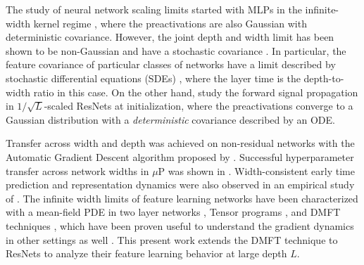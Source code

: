 \documentclass{article} %
\begin{document}
The study of neural network scaling limits started with MLPs in the infinite-width kernel regime \citep{jacot2018neural, neal2012bayesian, matthews2018gaussian, lee2017deep}, where the preactivations are also Gaussian with deterministic covariance. 
% 
However, the joint depth and width limit has been shown to be non-Gaussian \citep{hanin2020products, noci2021precise} and have a stochastic covariance \citep{li2021future}. 
% 
In particular, the feature covariance of particular classes of networks have a limit described by stochastic differential equations (SDEs) \citep{li2022neural,noci2023shaped}, where the layer time is the depth-to-width ratio in this case. 
% 
On the other hand, \cite{hayou2023width} study the forward signal propagation in ${1}/{\sqrt L}$-scaled ResNets at initialization, where the preactivations converge to a Gaussian distribution with a \emph{deterministic} covariance described by an ODE. 
% 
% 
% 


Transfer across width and depth was achieved on non-residual networks with the Automatic Gradient Descent algorithm proposed by \cite{bernstein2020distance, bernstein2023automatic}. Successful hyperparameter transfer across network widths in $\mu$P was shown in \cite{yang2021tuning}. Width-consistent early time prediction and representation dynamics were also observed in an empirical study of \cite{vyas2023featurelearning}. The infinite width limits of feature learning networks have been characterized with a mean-field PDE in two layer networks \citep{chizat2018global, mei2019mean, chizat2020implicit}, Tensor programs \citep{yang2020tensor, yang2021tensor}, and DMFT techniques \citep{bordelon2022self, bordelon2022influence, bordelon2023dynamics}, which have been proven useful to understand the gradient dynamics in other settings as well \citep{ mignacco2020dynamical, gerbelot2022rigorous}. This present work extends the DMFT technique to ResNets to analyze their feature learning behavior at large depth $L$. 
\end{document}
